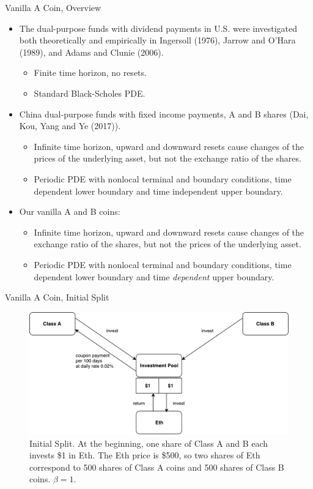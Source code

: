 \documentclass[notes=show, beamer, handout]{beamer}
\begin{document}
\begin{frame}{Vanilla A Coin, Overview}

\begin{itemize}
\item The dual-purpose funds with dividend payments in U.S. were investigated both theoretically and empirically in
Ingersoll (1976), Jarrow and O'Hara (1989), and Adams and Clunie (2006).
\begin{itemize}
\item Finite time horizon, no resets.
\item Standard Black-Scholes PDE.
\end{itemize}
\item China dual-purpose funds with fixed income payments, A and B shares (Dai, Kou, Yang and Ye (2017)).
\begin{itemize}
\item Infinite time horizon, upward and downward resets cause changes of the prices of the underlying asset, but not the exchange ratio of the shares.
\item Periodic PDE with nonlocal terminal and boundary conditions, time dependent lower boundary and time independent upper boundary.
\end{itemize}

\item Our vanilla A and B coins:
\begin{itemize}
\item Infinite time horizon,  upward and downward resets cause changes of the exchange ratio of the shares, but not the prices of the underlying asset.
\item Periodic PDE with nonlocal terminal and boundary conditions, time dependent lower boundary and time {\it dependent} upper boundary.
\end{itemize}
\end{itemize}

\end{frame}



\begin{frame}{Vanilla A Coin, Initial Split}

\begin{figure}
\includegraphics[width=\textwidth]{initial.pdf}
\caption{\footnotesize Initial Split. At the beginning, one share of Class A and B each invests \$1 in Eth. The Eth price is \$500, so two shares of Eth correspond to 500 shares of Class A coins and 500 shares of Class B coins. $\beta=1$.}
\end{figure}
\end{frame}
\end{document}

